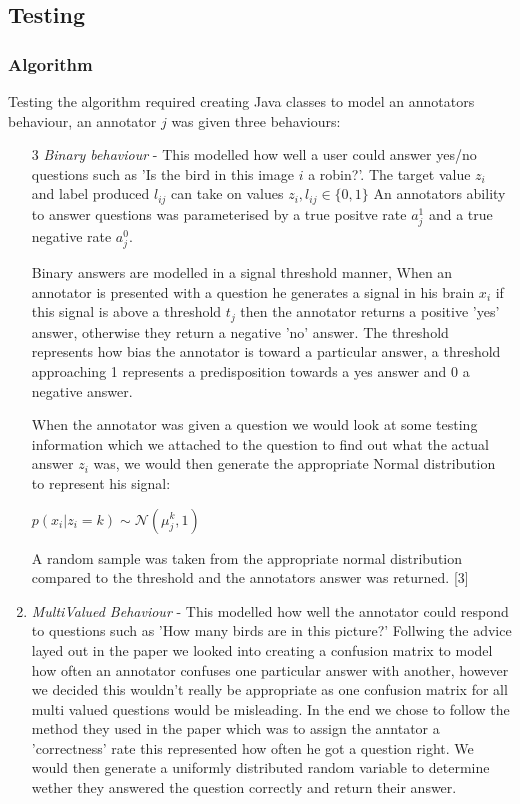 \documentclass[11pt]{article}
\begin{document}
\subsection{Testing}
\subsubsection{Algorithm}
Testing the algorithm required creating Java classes to model an annotators behaviour, an annotator $j$ was given three behaviours:

\begin{enumerate}
\item
[3]
\emph{Binary behaviour} - This modelled how well a user could answer yes/no questions such as 'Is the bird in this image $i$ a robin?'. The target
value $z_{i}$ and label produced $l_{ij}$ can take on values $z_{i}, l_{ij} \in \{0, 1\}$ An annotators ability to answer questions was 
parameterised by a true positve rate $a_{j}^{1}$ and a true negative rate $a_{j}^{0}$.

Binary answers are modelled in a 
signal threshold manner, When an annotator is presented with a question he generates a signal in his brain $x_{i}$ if this signal is above
a threshold $t_{j}$ then the annotator returns a positive 'yes' answer, otherwise they return a negative 'no' answer. The threshold represents
how bias the annotator is toward a particular answer, a threshold approaching 1 represents a predisposition towards a yes answer and 0 a 
negative answer.

When the annotator was given a question
we would look at some testing information which we attached to the question to find out what the actual answer $z_{i}$ was, we would then generate
the appropriate Normal distribution to represent his signal:

$p(x_{i} | z_{i} = k) \sim \mathcal{N}(\mu_{j}^{k} , 1)$

A random sample was taken from the appropriate normal distribution compared to the threshold and the annotators answer was returned. 
[3]
\item
\emph{MultiValued Behaviour} - This modelled how well the annotator could respond to questions such as 'How many birds are in this
picture?' Follwing the advice layed out in the paper we looked into creating a confusion matrix to model how often an annotator
confuses one particular answer with another, however we decided this wouldn't really be appropriate as one confusion matrix for all
multi valued questions would be misleading. In the end we chose to follow the method they used in the paper which was to 
assign the anntator a 'correctness' rate this represented how often he got a question right. We would then generate a uniformly distributed
random variable to determine wether they answered the question correctly and return their answer.


\end{enumerate}
\end{document}
